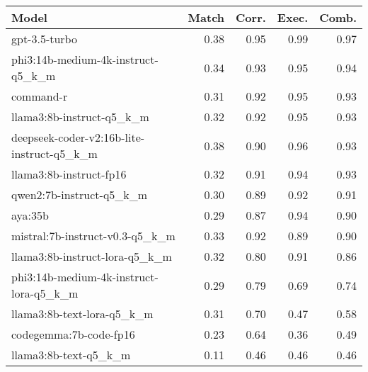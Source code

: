 \begin{tabular}{lrrrr}
\toprule
Model & Match & Corr. & Exec. & Comb. \\
\midrule
gpt-3.5-turbo & 0.38 & 0.95 & 0.99 & 0.97 \\
phi3:14b-medium-4k-instruct-q5\_k\_m & 0.34 & 0.93 & 0.95 & 0.94 \\
command-r & 0.31 & 0.92 & 0.95 & 0.93 \\
llama3:8b-instruct-q5\_k\_m & 0.32 & 0.92 & 0.95 & 0.93 \\
deepseek-coder-v2:16b-lite-instruct-q5\_k\_m & 0.38 & 0.90 & 0.96 & 0.93 \\
llama3:8b-instruct-fp16 & 0.32 & 0.91 & 0.94 & 0.93 \\
qwen2:7b-instruct-q5\_k\_m & 0.30 & 0.89 & 0.92 & 0.91 \\
aya:35b & 0.29 & 0.87 & 0.94 & 0.90 \\
mistral:7b-instruct-v0.3-q5\_k\_m & 0.33 & 0.92 & 0.89 & 0.90 \\
llama3:8b-instruct-lora-q5\_k\_m & 0.32 & 0.80 & 0.91 & 0.86 \\
phi3:14b-medium-4k-instruct-lora-q5\_k\_m & 0.29 & 0.79 & 0.69 & 0.74 \\
llama3:8b-text-lora-q5\_k\_m & 0.31 & 0.70 & 0.47 & 0.58 \\
codegemma:7b-code-fp16 & 0.23 & 0.64 & 0.36 & 0.49 \\
llama3:8b-text-q5\_k\_m & 0.11 & 0.46 & 0.46 & 0.46 \\
\bottomrule
\end{tabular}
